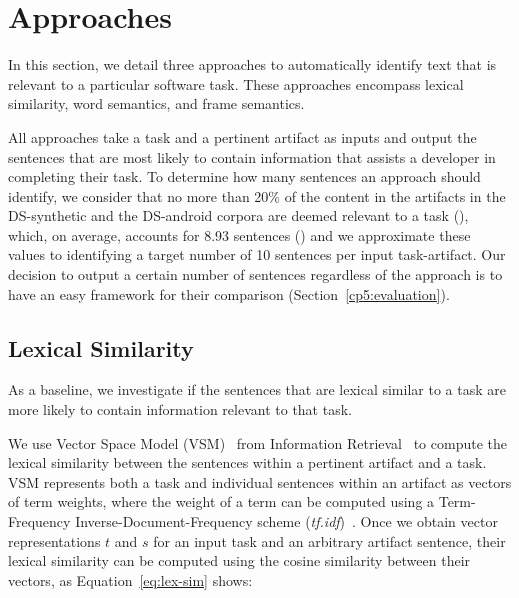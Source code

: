 \section{Approaches}
\label{cp5:approaches}


In this section, we detail three approaches to automatically identify text that is relevant to a particular software task.
These approaches encompass lexical similarity, word semantics, and frame semantics.


All approaches take a task and a pertinent artifact as inputs and output the sentences 
that are most likely to contain information that assists a developer in completing their task. 
To determine how many sentences an approach should identify, we consider that 
no more than 20\% of the content in the artifacts in the
 \acs{DS-synthetic} and the \acs{DS-android} corpora are deemed relevant to a task (), which, on average, accounts for 8.93 sentences ()
 and we approximate these values to identifying a target number of 10 sentences per input task-artifact. 
Our decision to output a certain number of sentences regardless of the approach is to have an easy framework for their comparison (Section~\ref{cp5:evaluation}).


\subsection{Lexical Similarity}

As a baseline, we investigate if the sentences that are lexical similar
to a task are more likely to contain information relevant to that task. 


We use Vector Space Model (VSM)~\cite{Salton1975vsm} from Information Retrieval~\cite{Manning2009IR}
to compute the lexical similarity between the sentences within a pertinent artifact and a task. 
VSM represents both a task and individual sentences within an artifact as vectors of term weights,
where the weight of a term
can be computed using a Term-Frequency Inverse-Document-Frequency scheme (\textit{tf.idf})~\cite{Manning2009IR}. 
Once we obtain vector representations $t$ and $s$ 
for an input task and an arbitrary artifact sentence, 
their lexical similarity can be computed 
using the cosine similarity between their vectors, as Equation~\ref{eq:lex-sim} shows:




